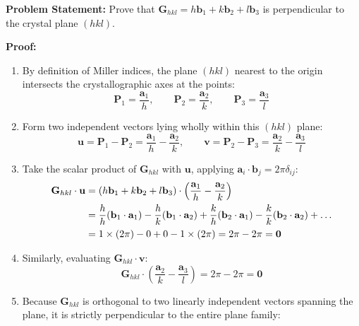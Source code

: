 \documentclass[11pt,a4paper]{article}
\begin{document}
\begin{solbox}
\textbf{Problem Statement:} Prove that $\mathbf{G}_{hkl} = h\mathbf{b}_1 + k\mathbf{b}_2 + l\mathbf{b}_3$ is perpendicular to the crystal plane $(hkl)$.

\textbf{Proof:}
\begin{enumerate}
    \item By definition of Miller indices, the plane $(hkl)$ nearest to the origin intersects the crystallographic axes at the points:
    \begin{equation}
    \mathbf{P}_1 = \frac{\mathbf{a}_1}{h}, \qquad \mathbf{P}_2 = \frac{\mathbf{a}_2}{k}, \qquad \mathbf{P}_3 = \frac{\mathbf{a}_3}{l}
    \end{equation}
    \item Form two independent vectors lying wholly within this $(hkl)$ plane:
    \begin{equation}
    \mathbf{u} = \mathbf{P}_1 - \mathbf{P}_2 = \frac{\mathbf{a}_1}{h} - \frac{\mathbf{a}_2}{k}, \qquad \mathbf{v} = \mathbf{P}_2 - \mathbf{P}_3 = \frac{\mathbf{a}_2}{k} - \frac{\mathbf{a}_3}{l}
    \end{equation}
    \item Take the scalar product of $\mathbf{G}_{hkl}$ with $\mathbf{u}$, applying $\mathbf{a}_i \cdot \mathbf{b}_j = 2\pi\delta_{ij}$:
    \begin{align}
    \mathbf{G}_{hkl} \cdot \mathbf{u} &= (h\mathbf{b}_1 + k\mathbf{b}_2 + l\mathbf{b}_3) \cdot \left(\frac{\mathbf{a}_1}{h} - \frac{\mathbf{a}_2}{k}\right) \notag\\
    &= \frac{h}{h}(\mathbf{b}_1 \cdot \mathbf{a}_1) - \frac{h}{k}(\mathbf{b}_1 \cdot \mathbf{a}_2) + \frac{k}{h}(\mathbf{b}_2 \cdot \mathbf{a}_1) - \frac{k}{k}(\mathbf{b}_2 \cdot \mathbf{a}_2) + \dots \notag\\
    &= 1 \times (2\pi) - 0 + 0 - 1 \times (2\pi) = 2\pi - 2\pi = \mathbf{0}
    \end{align}
    \item Similarly, evaluating $\mathbf{G}_{hkl} \cdot \mathbf{v}$:
    \begin{equation}
    \mathbf{G}_{hkl} \cdot \left(\frac{\mathbf{a}_2}{k} - \frac{\mathbf{a}_3}{l}\right) = 2\pi - 2\pi = \mathbf{0}
    \end{equation}
    \item Because $\mathbf{G}_{hkl}$ is orthogonal to two linearly independent vectors spanning the plane, it is strictly perpendicular to the entire plane family:

\end{enumerate}
\end{solbox}
\end{document}
